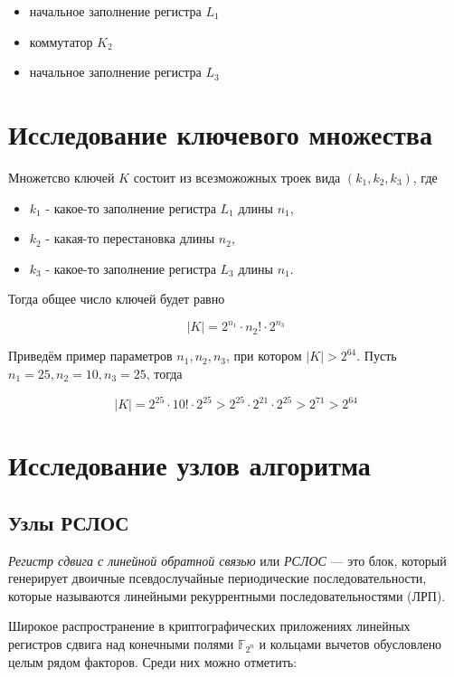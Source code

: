 \documentclass[a4paper,12pt]{article}
\theoremstyle{definition}
\begin{document}
	\begin{itemize}[topsep=0pt, itemsep=0pt, parsep=0pt]
	\item начальное заполнение регистра $L_1$
	\item коммутатор $K_2$
	\item начальное заполнение регистра $L_3$
	\end{itemize}

	\section{Исследование ключевого множества}
	
	Множетсво ключей $K$ состоит из всезможожных троек вида $(k_1, k_2, k_3)$, где 
	
	\begin{itemize}[topsep=0pt, itemsep=0pt, parsep=0pt]
	\item $k_1$ - какое-то заполнение регистра $L_1$ длины $n_1$,
	\item $k_2$ - какая-то перестановка длины $n_2$, 
	\item $k_3$ - какое-то заполнение регистра $L_3$ длины $n_1$.
	\end{itemize}
	
	Тогда общее число ключей будет равно
	
	\[ |K| = 2^{n_1} \cdot n_2! \cdot 2^{n_3} \]
	
	Приведём пример параметров $n_1, n_2, n_3$, при котором $|K| > 2^{64}$. Пусть $n_1=25, n_2=10, n_3=25$, тогда
	
	\[ |K| = 2^{25} \cdot 10! \cdot 2^{25} > 2^{25} \cdot 2^{21} \cdot 2^{25} > 2^{71} > 2^{64} \]
	
	\section{Исследование узлов алгоритма}
	
	\subsection{Узлы РСЛОС} \label{Узлы РСЛОС}
	
	\textit{Регистр сдвига с линейной обратной связью} или \textit{РСЛОС} --- это блок, который генерирует двоичные псевдослучайные периодические последовательности, которые называются линейными рекуррентными последовательностями (ЛРП). 
	
	Широкое распространение в криптографических приложениях линейных регистров сдвига над конечными полями $\mathbb{F}_{2^n}$ и кольцами вычетов обусловлено целым рядом факторов. Среди них можно отметить:
	
\end{document}
